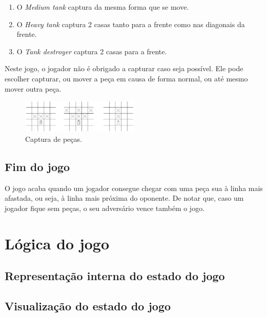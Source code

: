 \documentclass[a4paper,11pt,portuguese]{article}
\begin{document}
\begin{enumerate}[topsep=4pt,itemsep=2pt]
    \item O \textit{Medium tank} captura da mesma forma que se move.
    \item O \textit{Heavy tank} captura 2 casas tanto para a frente 
    como nas diagonais da frente.
    \item O \textit{Tank destroyer} captura 2 casas para a frente.
\end{enumerate}

\noindent Neste jogo, o jogador não é obrigado a capturar caso seja possível.
Ele pode escolher capturar, ou mover a peça em causa de forma normal, ou até
mesmo mover outra peça.

\begin{figure}[H]
    \centering
    \includegraphics[width=0.5\textwidth]{imgs/capture.png}
    \caption{Captura de peças.}
    \label{fig:capture}
\end{figure}

\subsection{Fim do jogo}

O jogo acaba quando um jogador consegue chegar com uma peça sua à linha mais
afastada, ou seja, à linha mais próxima do oponente.
De notar que, caso um jogador fique sem peças, o seu adversário vence também o jogo.


\section{Lógica do jogo}

    \subsection{Representação interna do estado do jogo}



    \subsection{Visualização do estado do jogo}
\end{document}

